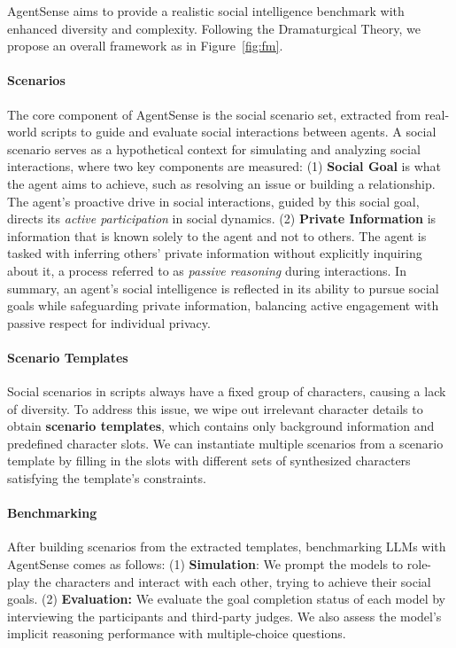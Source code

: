 AgentSense aims to provide a realistic social intelligence benchmark with enhanced diversity and complexity.
Following the Dramaturgical Theory, we propose an overall framework as in Figure~\ref{fig:fm}.

\paragraph{Scenarios}
The core component of AgentSense is the social scenario set, extracted from real-world scripts to guide and evaluate social interactions between agents.
A social scenario serves as a hypothetical context for simulating and analyzing social interactions, where two key components are measured:
(1) \textbf{Social Goal} is what the agent aims to achieve, such as resolving an issue or building a relationship.
The agent's proactive drive in social interactions, guided by this social goal, directs its \emph{active participation} in social dynamics.
(2) \textbf{Private Information} is information that is known solely to the agent and not to others.
The agent is tasked with inferring others' private information without explicitly inquiring about it, a process referred to as \emph{passive reasoning} during interactions.
In summary, an agent's social intelligence is reflected in its ability to pursue social goals while safeguarding private information, balancing active engagement with passive respect for individual privacy.

\paragraph{Scenario Templates}
Social scenarios in scripts always have a fixed group of characters, causing a lack of diversity.
To address this issue, we wipe out irrelevant character details to obtain \textbf{scenario templates}, which contains only background information and predefined character slots.
We can instantiate multiple scenarios from a scenario template by filling in the slots with different sets of synthesized characters satisfying the template's constraints.

\paragraph{Benchmarking}
After building scenarios from the extracted templates, benchmarking LLMs with AgentSense comes as follows:
(1) \textbf{Simulation}: We prompt the models to role-play the characters and interact with each other, trying to achieve their social goals.
(2) \textbf{Evaluation:} We evaluate the goal completion status of each model by interviewing the participants and third-party judges.
We also assess the model's implicit reasoning performance with multiple-choice questions.
